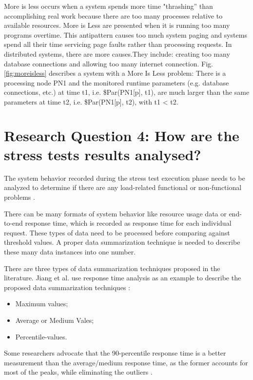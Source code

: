 More is less occurs when a system spends more time "thrashing” than accomplishing real work because there are too many processes relative to available resources. More is Less are presented when it is running too many programs overtime. This antipattern causes too much system paging and systems spend all their time servicing page faults rather than processing requests. In distributed systems, there are more causes.They include: creating too many database connections and  allowing too many internet connection. Fig. \ref{fig:moreisless} describes a system  with a More Is Less problem: There is a processing node PN1 and the monitored runtime parameters (e.g. database connections, etc.) at time t1, i.e. \$Par(PN1[p], t1), are much larger than the same parameters at time t2, i.e. \$Par(PN1[p], t2), with t1 < t2. 


\section{Research Question 4: How are the stress tests results analysed?}

The system behavior recorded during the stress test execution phase needs to be analyzed to determine if there are any load-related functional or non-functional problems \cite{Jiang2010}. 


There can be many formats of system behavior like resource usage data or end-to-end response time, which is recorded as response time for each individual request. These types of data need to be processed before comparing against threshold values. A proper data summarization technique is needed to describe these many data instances into one number. 


There are three types of data summarization techniques proposed in the literature. Jiang et al. use response time analysis as an example to describe the proposed data summarization techniques \cite{Jiang2010}:

\begin{itemize}
\item Maximum values;
\item Average or Medium Vales;
\item Percentile-values. 
\end{itemize}


Some researchers advocate that the 90-percentile response time is a better measurement than the average/medium response time, as the former accounts for most of the peaks, while eliminating the outliers \cite{Jiang2010}.



